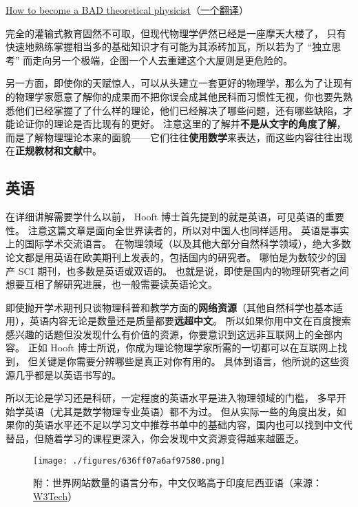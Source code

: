 \href{https://webspace.science.uu.nl/~hooft101/theoristbad.html#:~:text=On\%20your\%20way\%20towards\%20becoming,have\%20your\%20work\%20published\%20anyway.}{How to become a BAD theoretical physicist}（\href{https://zhuanlan.zhihu.com/p/38680467}{一个翻译}）

完全的灌输式教育固然不可取，但现代物理学俨然已经是一座摩天大楼了， 只有快速地熟练掌握相当多的基础知识才有可能为其添砖加瓦，所以若为了 “独立思考” 而走向另一个极端，企图一个人去重建这个大厦则是更危险的。

另一方面，即使你的天赋惊人，可以从头建立一套更好的物理学，那么为了让现有的物理学家愿意了解你的成果而不把你误会成其他民科而习惯性无视，你也要先熟悉他们已经掌握了了什么样的理论，他们已经解决了哪些问题，还有哪些缺陷，才能论证你的理论是否比现有的更好。 注意这里的了解并\textbf{不是从文字的角度了解}，而是了解物理理论本来的面貌——它们往往\textbf{使用数学}来表达，而这些内容往往出现在\textbf{正规教材和文献}中。

\subsection{英语}
在详细讲解需要学什么以前， Hooft 博士首先提到的就是英语，可见英语的重要性。 注意这篇文章是面向全世界读者的，所以对中国人也同样适用。 英语是事实上的国际学术交流语言。 在物理领域（以及其他大部分自然科学领域），绝大多数论文都是用英语在欧美期刊上发表的，包括国内的研究者。 哪怕是为数较少的国产 SCI 期刊，也多数是英语或双语的。 也就是说，即使是国内的物理研究者之间想要互相了解研究进展，也一般需要读英语论文。

即使抛开学术期刊只谈物理科普和教学方面的\textbf{网络资源}（其他自然科学也基本适用），英语内容无论是数量还是质量都要\textbf{远超中文}。 所以如果你用中文在百度搜索感兴趣的话题但没发现什么有价值的资源，你要意识到这远非互联网上的全部内容。 正如 Hooft 博士所说，你成为理论物理学家所需的一切都可以在互联网上找到， 但关键是你需要分辨哪些是真正对你有用的。 具体到语言，他所说的这些资源几乎都是以英语书写的。

所以无论是学习还是科研，一定程度的英语水平是进入物理领域的门槛， 多早开始学英语（尤其是数学物理专业英语）都不为过。 但从实际一些的角度出发，如果你的英语水平还不足以学习文中推荐书单中的基础内容，国内也可以找到中文代替品，但随着学习的课程更深入，你会发现中文资源变得越来越匮乏。

\begin{figure}[ht]
\centering
\texttt{[image: ./figures/636ff07a6af97580.png]}
\caption{附：世界网站数量的语言分布，中文仅略高于印度尼西亚语（来源：\href{https://w3techs.com/technologies/overview/content_language}{W3Tech}）} \label{fig_SdyPhy_2}
\end{figure}

